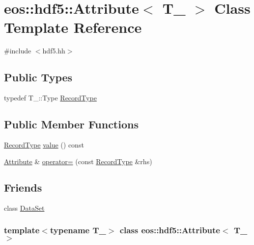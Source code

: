 \hypertarget{classeos_1_1hdf5_1_1Attribute}{
\section{eos::hdf5::Attribute$<$ T\_\- $>$ Class Template Reference}
\label{classeos_1_1hdf5_1_1Attribute}
}


{\ttfamily \#include $<$hdf5.hh$>$}\subsection*{Public Types}
\begin{DoxyCompactItemize}
\item 
typedef T\_\-::Type \hyperlink{classeos_1_1hdf5_1_1Attribute_a850f8d6a8627d113047d4c2b29d41430}{RecordType}
\end{DoxyCompactItemize}
\subsection*{Public Member Functions}
\begin{DoxyCompactItemize}
\item 
\hyperlink{classeos_1_1hdf5_1_1Attribute_a850f8d6a8627d113047d4c2b29d41430}{RecordType} \hyperlink{classeos_1_1hdf5_1_1Attribute_a94f3f6fc67fe675a40cfd753da895030}{value} () const 
\item 
\hyperlink{classeos_1_1hdf5_1_1Attribute}{Attribute} \& \hyperlink{classeos_1_1hdf5_1_1Attribute_a949efcd5b6094a0e5bc88e67dee0ddc2}{operator=} (const \hyperlink{classeos_1_1hdf5_1_1Attribute_a850f8d6a8627d113047d4c2b29d41430}{RecordType} \&rhs)
\end{DoxyCompactItemize}
\subsection*{Friends}
\begin{DoxyCompactItemize}
\item 
class \hyperlink{classeos_1_1hdf5_1_1Attribute_aef648af6c56fa8ee0738c93629e725dc}{DataSet}
\end{DoxyCompactItemize}
\subsubsection*{template$<$typename T\_\-$>$ class eos::hdf5::Attribute$<$ T\_\- $>$}



